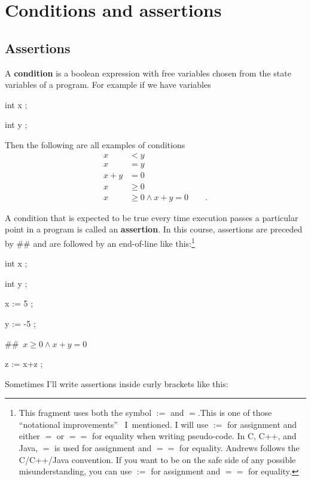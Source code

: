 \documentclass[muchmore,11pt]{article}%
\begin{document}
\section{Conditions and assertions\label{assertions}}

\subsection{Assertions}

A \textbf{condition} is a boolean expression with free variables chosen from
the state variables of a program. For example if we have variables

\begin{code}
int x ;

int y ;
\end{code}

Then the following are all examples of conditions%
\begin{align*}
x  &  <y\\
x  &  =y\\
x+y  &  =0\\
x  &  \geq0\\
x  &  \geq0\wedge x+y=0\qquad\text{.}%
\end{align*}


A condition that is expected to be true every time execution passes a
particular point in a program is called an \textbf{assertion}. In this course,
assertions are preceded by \#\# and are followed by an end-of-line like
this:\footnote{This fragment uses both the symbol $:=$ and $=$.This is one of
those \textquotedblleft notational improvements\textquotedblright%
\ I\ mentioned. I will use $:=$ for assignment and either $=$ or $==$ for
equality when writing pseudo-code. In C, C++, and Java, $=$ is used for
assignment and $==$ for equality. Andrews follows the C/C++/Java convention.
If you want to be on the safe side of any possible misunderstanding, you can
use $:=$ for assignment and $==$ for equality.}

\begin{code}
int x ;

int y ;

x := 5 ;

y := -5 ;

\#\#\ $x\geq0\wedge x+y=0$

z := x+z ;
\end{code}

Sometimes I'll write assertions inside curly brackets like this:
\end{document}
